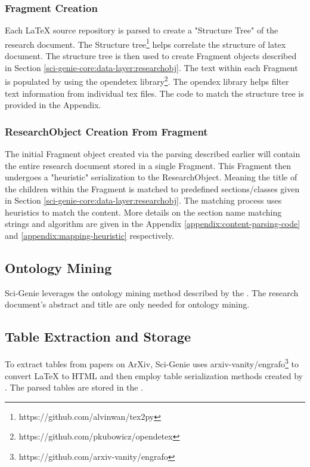 \subsubsection{Fragment Creation}
\label{sci-genie-core:scraping:source-frag}
Each LaTeX source repository is parsed to create a "Structure Tree" of the research document. The Structure tree\footnote{https://github.com/alvinwan/tex2py} helps correlate the structure of latex document. The structure tree is then used to create Fragment objects described in Section \ref{sci-genie-core:data-layer:researchobj}. The text within each Fragment is populated by using the opendetex library\footnote{https://github.com/pkubowicz/opendetex}. The opendex library helps filter text information from individual tex files. The code to match the structure tree is provided in the Appendix. 

\subsubsection{ResearchObject Creation From Fragment}
\label{sci-genie-core:scraping:frag-to-rs}
The initial Fragment object created via the parsing described earlier will contain the entire research document stored in a single Fragment. This Fragment then undergoes a "heuristic" serialization to the ResearchObject. Meaning the title of the children within the Fragment is matched to predefined sections/classes given in Section \ref{sci-genie-core:data-layer:researchobj}. The matching process uses heuristics to match the content. More details on the section name matching strings and algorithm are given in the Appendix \ref{appendix:content-parsing-code} and \ref{appendix:mapping-heuristic} respectively. 

\subsection{Ontology Mining}
Sci-Genie leverages the ontology mining method described by the \cite{salatino2020ontology}. The research document's abstract and title are only needed for ontology mining. 

\subsection{Table Extraction and Storage}
To extract tables from papers on ArXiv, Sci-Genie uses arxiv-vanity/engrafo\footnote{https://github.com/arxiv-vanity/engrafo} to convert LaTeX to HTML and then employ table serialization methods created by \cite{kardas2020axcell}. The parsed tables are stored in the . 


